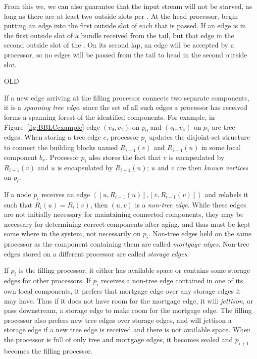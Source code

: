 From this we, we can also guarantee that the input stream will not be starved, as long as there are at least two outside slots per \bundlens. At the head processor, begin putting an edge into the first outside slot of each \bundle that is passed. If an edge is in the first outside slot of a bundle received from the tail, but that edge in the second outside slot of the \bundlens. On its second lap, an edge will be accepted by a processor, so no edges will be passed from the tail to head in the second outside slot.
\fi

\iffalse  OLD

If a new edge arriving at the filling processor connects two separate components, it is a \emph{spanning tree edge}, since the set of all such edges a processor has received forms a spanning forest of the identified components. For example, in Figure~\ref{fig:BBLCexample} edge $(v_0,v_1)$ on $p_0$ and $(v_0,v_4)$ on $p_1$ are tree edges. When storing a tree edge $e$, processor $p_i$ updates the disjoint-set structure to connect the building blocks named $R_{i-1}(v)$ and $R_{i-1}(u)$ in some local component $b_x$. Processor $p_i$ also stores the fact that $v$ is encapsulated by $R_{i-1}(v)$ and $u$ is encapsulated by $R_{i-1}(u)$; $u$ and $v$ are then \emph{known vertices} on $p_i$. 

If a node $p_i$ receives an edge $([u,R_{i-1}(u)],[v,R_{i-1}(v)])$ and relabels it such that $R_i(u) = R_i(v)$, then $(u,v)$ is a \emph{non-tree edge}. While these edges are not initially necessary for maintaining connected components, they may be necessary for determining correct components after aging, and thus must be kept some where in the system, not necessarily on $p_i$. Non-tree edges held on the same processor as the component containing them are called \emph{mortgage edges}. Non-tree edges stored on a different processor are called \emph{storage edges}.

If $p_i$ is the filling processor, it either has available space or contains some storage edges for other processors. If $p_i$ receives a non-tree edge contained in one of its own local components, it prefers that mortgage edge over any storage edges it may have. Thus if it does not have room for the mortgage edge, it will \emph{jettison}, or pass downstream, a storage edge to make room for the mortgage edge. The filling processor also prefers new tree edges over storage edges, and will jettison a storage edge if a new tree edge is received and there is not available space. When the processor is full of only tree and mortgage edges, it becomes sealed and $p_{i+1}$ becomes the filling processor. 

